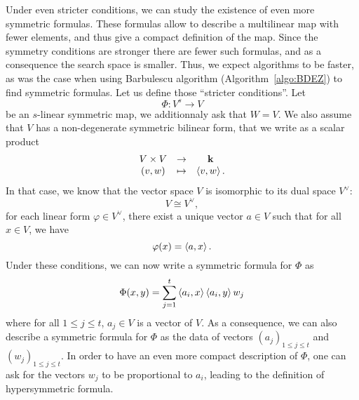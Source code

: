 Under even stricter conditions, we can study the existence of even more
symmetric formulas. These formulas allow to describe a multilinear map with
fewer elements, and thus give a compact definition of the map. Since the
symmetry conditions are stronger there are fewer such formulas, and as a
consequence the search space is smaller. Thus, we expect algorithms to be
faster, as was the case when using Barbulescu \etal algorithm
(Algorithm~\ref{algo:BDEZ}) to find symmetric formulas. Let us define those
``stricter conditions''. Let
\[
  \Phi:V^s\to V
\]
be an $s$-linear symmetric map, \ie we additionnaly ask that $W=V$. We also
assume that $V$ has a non-degenerate symmetric bilinear form, that we write as a
scalar product
\[
 \begin{array}{ccc}
 V\times V &\to&\mathbf{k}\\
 (v,w)&\mapsto&\left\langle v,w\right\rangle.
 \end{array}
\]
In that case, we know that the vector space $V$ is isomorphic to its dual space
$V^\vee$:
\[
  V\cong V^\vee,
\]
\ie for each linear form $\varphi\in V^\vee$, there exist a unique vector $a\in
V$ such that for all $x\in V$, we have
\[
  \varphi(x) = \left\langle a,x\right\rangle.
\]
Under these conditions, we can now write a symmetric formula for $\Phi$ as
\[
  \Phi(x, y) = \sum_{j=1}^t\left\langle a_i,x\right\rangle\left\langle a_i,y\right\rangle w_j
\]
where for all $1\leq j\leq t$, $a_j\in V$ is a vector of $V$. As a consequence,
we can also describe a symmetric formula for $\Phi$ as the data of vectors
$(a_j)_{1\leq j\leq t}$ and $(w_j)_{1\leq j\leq t}$. In order to have an even
more compact description of $\Phi$, one can ask for the vectors $w_j$ to be
proportional to $a_i$, leading to the definition of hypersymmetric
formula.
%
%
%
%
%


